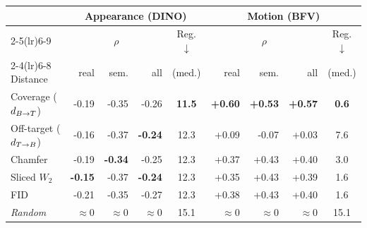 \begin{tabular}{l rrr c rrr c}
\toprule
 & \multicolumn{4}{c}{Appearance (DINO)} & \multicolumn{4}{c}{Motion (BFV)} \\
\cmidrule(lr){2-5}\cmidrule(lr){6-9}
 & \multicolumn{3}{c}{$\rho$} & Reg.$\downarrow$ & \multicolumn{3}{c}{$\rho$} & Reg.$\downarrow$ \\
\cmidrule(lr){2-4}\cmidrule(lr){6-8}
Distance & real & sem. & all & (med.) & real & sem. & all & (med.) \\
\midrule
Coverage ($d_{B\to T}$)   & -0.19 & -0.35 & -0.26 & \textbf{11.5} & \cellcolor{green!15}\textbf{+0.60} & \cellcolor{green!15}\textbf{+0.53} & \cellcolor{green!15}\textbf{+0.57} & \textbf{0.6} \\
Off-target ($d_{T\to B}$) & -0.16 & -0.37 & \textbf{-0.24} & 12.3 & +0.09 & -0.07 & +0.03 & 7.6 \\
Chamfer             & -0.19 & \textbf{-0.34} & -0.25 & 12.3 & +0.37 & +0.43 & +0.40 & 3.0 \\
Sliced $W_2$        & \textbf{-0.15} & -0.37 & \textbf{-0.24} & 12.3 & +0.35 & +0.43 & +0.39 & 1.6 \\
FID                 & -0.21 & -0.35 & -0.27 & 12.3 & +0.38 & +0.43 & +0.40 & 1.6 \\
\midrule
\emph{Random}       & $\approx$0 & $\approx$0 & $\approx$0 & 15.1 & $\approx$0 & $\approx$0 & $\approx$0 & 15.1 \\
\bottomrule
\end{tabular}
